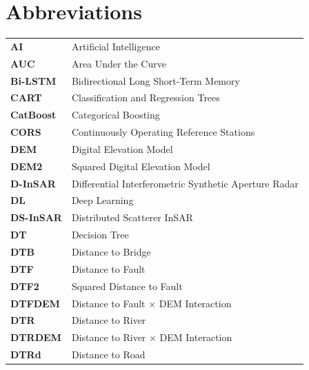 \documentclass[oneside,doublespacing,flushright]{lsuthesis}
\begin{document}
\chapter{Abbreviations}
\noindent
\begin{tabular}{@{}l@{\hspace{4em}}l@{}}
\textbf{AI} & Artificial Intelligence \\
\textbf{AUC} & Area Under the Curve \\
\textbf{Bi-LSTM} & Bidirectional Long Short-Term Memory \\
\textbf{CART} & Classification and Regression Trees \\
\textbf{CatBoost} & Categorical Boosting \\
\textbf{CORS} & Continuously Operating Reference Stations \\
\textbf{DEM} & Digital Elevation Model \\
\textbf{DEM2} & Squared Digital Elevation Model \\
\textbf{D-InSAR} & Differential Interferometric Synthetic Aperture Radar \\
\textbf{DL} & Deep Learning \\
\textbf{DS-InSAR} & Distributed Scatterer InSAR \\
\textbf{DT} & Decision Tree \\
\textbf{DTB} & Distance to Bridge \\
\textbf{DTF} & Distance to Fault \\
\textbf{DTF2} & Squared Distance to Fault \\
\textbf{DTFDEM} & Distance to Fault $\times$ DEM Interaction \\
\textbf{DTR} & Distance to River \\
\textbf{DTRDEM} & Distance to River $\times$ DEM Interaction \\
\textbf{DTRd} & Distance to Road \\
\end{tabular}
\end{document}
